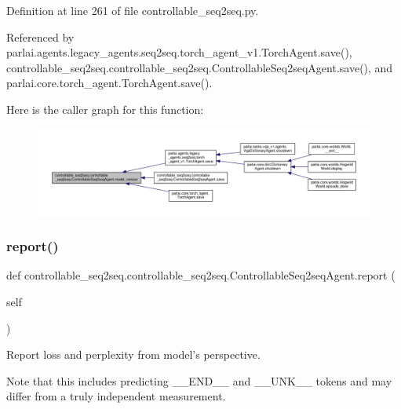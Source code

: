 Definition at line 261 of file controllable\+\_\+seq2seq.\+py.



Referenced by parlai.\+agents.\+legacy\+\_\+agents.\+seq2seq.\+torch\+\_\+agent\+\_\+v1.\+Torch\+Agent.\+save(), controllable\+\_\+seq2seq.\+controllable\+\_\+seq2seq.\+Controllable\+Seq2seq\+Agent.\+save(), and parlai.\+core.\+torch\+\_\+agent.\+Torch\+Agent.\+save().

Here is the caller graph for this function\+:
\nopagebreak
\begin{figure}[H]
\begin{center}
\leavevmode
\includegraphics[width=350pt]{classcontrollable__seq2seq_1_1controllable__seq2seq_1_1ControllableSeq2seqAgent_a8995fe4b50a61a5b6c139d26dbb57ca2_icgraph}
\end{center}
\end{figure}
\mbox{\label{classcontrollable__seq2seq_1_1controllable__seq2seq_1_1ControllableSeq2seqAgent_a0e4d244d148a011ab541b204518e227a}} 
\subsubsection{\texorpdfstring{report()}{report()}}
{\footnotesize\ttfamily def controllable\+\_\+seq2seq.\+controllable\+\_\+seq2seq.\+Controllable\+Seq2seq\+Agent.\+report (\begin{DoxyParamCaption}\item[{}]{self }\end{DoxyParamCaption})}

\begin{DoxyVerb}Report loss and perplexity from model's perspective.

Note that this includes predicting __END__ and __UNK__ tokens and may
differ from a truly independent measurement.
\end{DoxyVerb}
 

